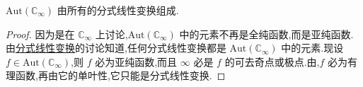 \documentclass[../../main.tex]{subfiles}
\begin{document}
\begin{theorem}\label{theorem:定理5.3.5}
\( \mathrm{Aut}(\mathbb{C}_{\infty}) \) 由所有的分式线性变换组成.
\end{theorem}
\begin{proof}
因为是在 \( \mathbb{C}_{\infty} \) 上讨论,\( \mathrm{Aut}(\mathbb{C}_{\infty}) \) 中的元素不再是全纯函数,而是亚纯函数.由\hyperref[section:2.2.5]{分式线性变换}的讨论知道,任何分式线性变换都是 \( \mathrm{Aut}(\mathbb{C}_{\infty}) \) 中的元素.现设 \( f \in \mathrm{Aut}(\mathbb{C}_{\infty}) \),则 \( f \) 必为亚纯函数,而且 \( \infty \) 必是 \( f \) 的可去奇点或极点.由,\( f \) 必为有理函数,再由它的单叶性,它只能是分式线性变换.
\end{proof}
\end{document}
